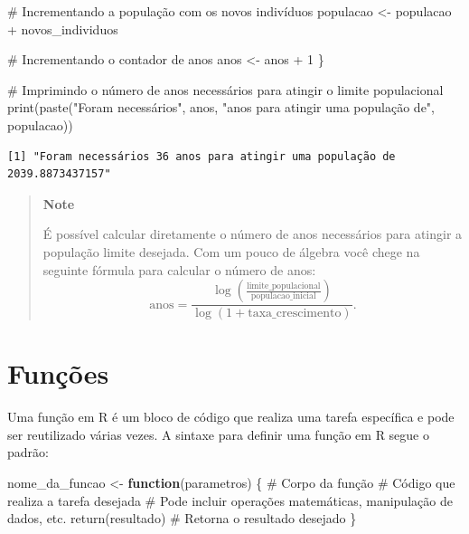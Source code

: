 \documentclass[
  portuguese,
  letterpaper,
  DIV=11,
  numbers=noendperiod]{scrreprt}
\newenvironment{Shaded}{\begin{snugshade}}{\end{snugshade}}
\newcommand{\CommentTok}[1]{\textcolor[rgb]{0.37,0.37,0.37}{#1}}
\newcommand{\ControlFlowTok}[1]{\textcolor[rgb]{0.00,0.23,0.31}{\textbf{#1}}}
\newcommand{\DecValTok}[1]{\textcolor[rgb]{0.68,0.00,0.00}{#1}}
\newcommand{\FunctionTok}[1]{\textcolor[rgb]{0.28,0.35,0.67}{#1}}
\newcommand{\NormalTok}[1]{\textcolor[rgb]{0.00,0.23,0.31}{#1}}
\newcommand{\OtherTok}[1]{\textcolor[rgb]{0.00,0.23,0.31}{#1}}
\newcommand{\SpecialCharTok}[1]{\textcolor[rgb]{0.37,0.37,0.37}{#1}}
\newcommand{\StringTok}[1]{\textcolor[rgb]{0.13,0.47,0.30}{#1}}
\theoremstyle{definition}
\theoremstyle{remark}
\begin{document}
\begin{tcolorbox}
\begin{Shaded}
\begin{Highlighting}[]
  \CommentTok{\# Incrementando a população com os novos indivíduos}
\NormalTok{  populacao }\OtherTok{\textless{}{-}}\NormalTok{ populacao }\SpecialCharTok{+}\NormalTok{ novos\_individuos}
  
  \CommentTok{\# Incrementando o contador de anos}
\NormalTok{  anos }\OtherTok{\textless{}{-}}\NormalTok{ anos }\SpecialCharTok{+} \DecValTok{1}
\NormalTok{\}}

\CommentTok{\# Imprimindo o número de anos necessários para atingir o limite populacional}
\FunctionTok{print}\NormalTok{(}\FunctionTok{paste}\NormalTok{(}\StringTok{"Foram necessários"}\NormalTok{, anos, }\StringTok{"anos para atingir uma população de"}\NormalTok{, populacao))}
\end{Highlighting}
\end{Shaded}

\begin{verbatim}
[1] "Foram necessários 36 anos para atingir uma população de 2039.8873437157"
\end{verbatim}

\begin{quote}
\textbf{Note}

É possível calcular diretamente o número de anos necessários para
atingir a população limite desejada. Com um pouco de álgebra você chege
na seguinte fórmula para calcular o número de anos:
\[\text{anos} = \frac{\log\left(\frac{\text{limite\_populacional}}{\text{populacao\_inicial}}\right)}{\log(1 + \text{taxa\_crescimento})}.\]
\end{quote}

\end{tcolorbox}

\section{Funções}\label{sec-fluxos-funcoes}

Uma função em R é um bloco de código que realiza uma tarefa específica e
pode ser reutilizado várias vezes. A sintaxe para definir uma função em
R segue o padrão:

\begin{Shaded}
\begin{Highlighting}[]
\NormalTok{nome\_da\_funcao }\OtherTok{\textless{}{-}} \ControlFlowTok{function}\NormalTok{(parametros) \{}
  \CommentTok{\# Corpo da função}
  \CommentTok{\# Código que realiza a tarefa desejada}
  \CommentTok{\# Pode incluir operações matemáticas, manipulação de dados, etc.}
  \FunctionTok{return}\NormalTok{(resultado)  }\CommentTok{\# Retorna o resultado desejado}
\NormalTok{\}}
\end{Highlighting}
\end{Shaded}
\end{document}
